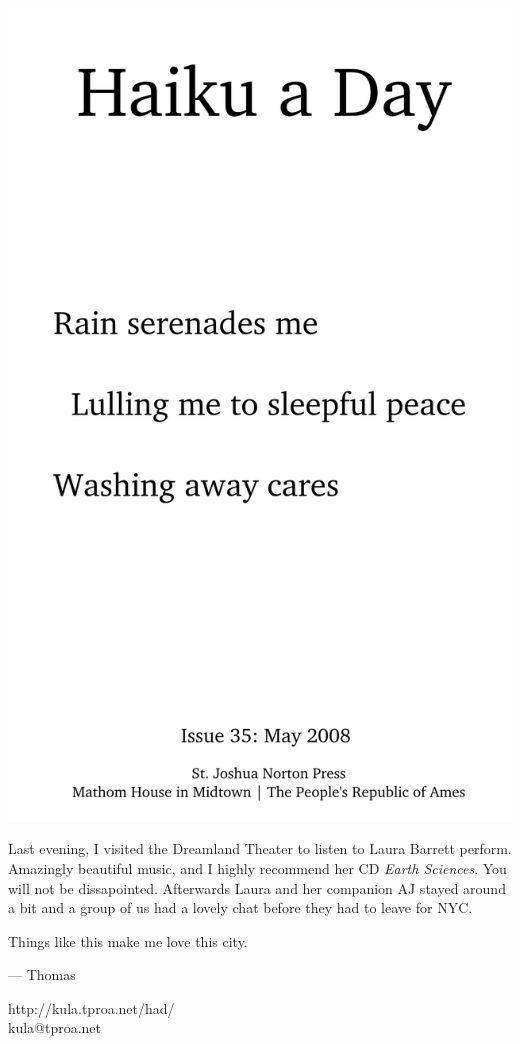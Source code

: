 \documentclass[12pt]{article}
\begin{document}
\includegraphics{frontpage.png}

\newpage

Last evening, I visited the Dreamland Theater to listen to
Laura Barrett perform. Amazingly beautiful music, and I
highly recommend her CD {\em Earth Sciences}. You will not
be dissapointed. Afterwards Laura and her companion AJ
stayed around a bit and a group of us had a lovely chat
before they had to leave for NYC.

Things like this make me love this city.


--- Thomas

http://kula.tproa.net/had/ \\
kula@tproa.net
\end{document}
